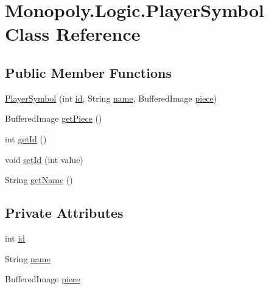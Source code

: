 \hypertarget{class_monopoly_1_1_logic_1_1_player_symbol}{}\section{Monopoly.\+Logic.\+Player\+Symbol Class Reference}
\label{class_monopoly_1_1_logic_1_1_player_symbol}
\subsection*{Public Member Functions}
\begin{DoxyCompactItemize}
\item 
\hyperlink{class_monopoly_1_1_logic_1_1_player_symbol_a075ca87d582d0b48f2cf8a189654e25e}{Player\+Symbol} (int \hyperlink{class_monopoly_1_1_logic_1_1_player_symbol_a45aa6d7ff0270887786b59b8a23f9f42}{id}, String \hyperlink{class_monopoly_1_1_logic_1_1_player_symbol_accd42c0b122203741494190e7b3aa9f0}{name}, Buffered\+Image \hyperlink{class_monopoly_1_1_logic_1_1_player_symbol_a4ee52adad6ccb63070f253641c27700e}{piece})
\item 
Buffered\+Image \hyperlink{class_monopoly_1_1_logic_1_1_player_symbol_ae598bde4cad04b4c4d6b8b7d54f0f28c}{get\+Piece} ()
\item 
int \hyperlink{class_monopoly_1_1_logic_1_1_player_symbol_af6c30d4c62b410cd12609fe7da0a94c8}{get\+Id} ()
\item 
void \hyperlink{class_monopoly_1_1_logic_1_1_player_symbol_a53c69d3e5d8ccfeaf7553540835fb63b}{set\+Id} (int value)
\item 
String \hyperlink{class_monopoly_1_1_logic_1_1_player_symbol_ae14de8f597ae37e6d000fc124230385c}{get\+Name} ()
\end{DoxyCompactItemize}
\subsection*{Private Attributes}
\begin{DoxyCompactItemize}
\item 
int \hyperlink{class_monopoly_1_1_logic_1_1_player_symbol_a45aa6d7ff0270887786b59b8a23f9f42}{id}
\item 
String \hyperlink{class_monopoly_1_1_logic_1_1_player_symbol_accd42c0b122203741494190e7b3aa9f0}{name}
\item 
Buffered\+Image \hyperlink{class_monopoly_1_1_logic_1_1_player_symbol_a4ee52adad6ccb63070f253641c27700e}{piece}
\end{DoxyCompactItemize}


